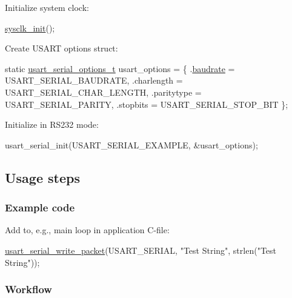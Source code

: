 \begin{DoxyEnumerate}
\item Initialize system clock\-:
\begin{DoxyItemize}
\item 
\begin{DoxyCode}
 \hyperlink{group__sysclk__group_ga242399e48a97739c88b4d0c00f6101de}{sysclk\_init}(); 
\end{DoxyCode}

\end{DoxyItemize}
\item Create U\-S\-A\-R\-T options struct\-:
\begin{DoxyItemize}
\item 
\begin{DoxyCode}
        \textcolor{keyword}{static} \hyperlink{structusart__rs232__options}{usart\_serial\_options\_t} usart\_options = \{
           .\hyperlink{structusart__rs232__options_a2c48c35d680d4805d357677d7d352fd0}{baudrate} = USART\_SERIAL\_BAUDRATE,
           .charlength = USART\_SERIAL\_CHAR\_LENGTH,
           .paritytype = USART\_SERIAL\_PARITY,
           .stopbits = USART\_SERIAL\_STOP\_BIT
        \};
\end{DoxyCode}

\end{DoxyItemize}
\item Initialize in R\-S232 mode\-:
\begin{DoxyItemize}
\item 
\begin{DoxyCode}
 usart\_serial\_init(USART\_SERIAL\_EXAMPLE, &usart\_options); 
\end{DoxyCode}

\end{DoxyItemize}
\end{DoxyEnumerate}\hypertarget{serial_use_case_1_serial_use_case_1_usage}{}\subsection{Usage steps}\label{serial_use_case_1_serial_use_case_1_usage}
\hypertarget{serial_use_case_1_serial_use_case_1_usage_code}{}\subsubsection{Example code}\label{serial_use_case_1_serial_use_case_1_usage_code}
Add to, e.\-g., main loop in application C-\/file\-: 
\begin{DoxyCode}
        \hyperlink{usart__serial_8h_af9393f1fa29d87970159fabd511b7de1}{usart\_serial\_write\_packet}(USART\_SERIAL, \textcolor{stringliteral}{"Test
       String"}, strlen(\textcolor{stringliteral}{"Test String"}));
\end{DoxyCode}
\hypertarget{serial_use_case_1_serial_use_case_1_usage_flow}{}\subsubsection{Workflow}\label{serial_use_case_1_serial_use_case_1_usage_flow}


